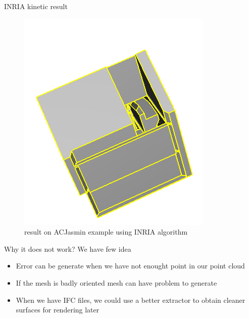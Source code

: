 \documentclass[10pt]{beamer}
\begin{document}
\begin{frame}{INRIA kinetic result }
\begin{figure}[H]
\begin{minipage}[t]{0.35\textwidth}
            \includegraphics[width=\textwidth]{../../images/screen_kinetic/ACJasmin_result_INRIA.png}
            \caption*{result}
          \end{minipage}
          \caption{result on ACJasmin example using INRIA algorithm}
      \end{figure}  
\end{frame}

\begin{frame}
    Why it does not work? We have few idea  
    \begin{itemize}
        \item Error can be generate when we have not enought point in our point cloud
        \item If the mesh is badly oriented mesh can have problem to generate
        \item When we have IFC files, we could use a better extractor to obtain cleaner surfaces for rendering later
    \end{itemize}
\end{frame} 
\end{document}
